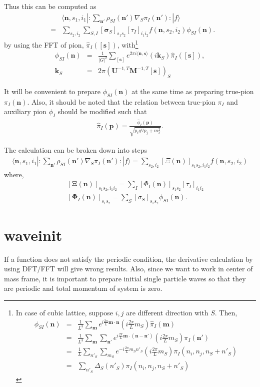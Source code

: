 \documentclass[10pt]{book}
\def\bm{\boldsymbol}
\newcommand{\bea}{\begin{eqnarray}}
\newcommand{\eea}{\end{eqnarray}}
\newcommand{\no}{\nonumber \\}
\def\vs{{\bm \sigma}}
\def\vm{{\bm m}}
\def\vn{{\bm n}}
\def\vp{{\bm p}}
\def\la{\langle}
\def\ra{\rangle}
\begin{document}
\begin{itemize}
	      Thus  this can be computed as
	      \bea 
	      & &\la \vn, s_1, i_1 | : \sum_{\vn'}  \rho_{SI}(\vn')\nabla_S\pi_I(\vn'): |f\ra \no 
	      &=& \sum_{s_2,i_2}\sum_{S,I}  [\vs_S]_{s_1 s_2}[\tau_I]_{i_1 i_2} f(\vn, s_2,i_2) \phi_{SI}(\vn).      
	      \eea
	      by using the FFT of pion,  $\hat{\pi}_I([{\bm s}])$, with\footnote{
	      In case of cubic lattice, 
	      suppose $i,j$ are different direction with $S$. Then,
	      \bea 
	      \phi_{SI}(\vn)&=& \frac{1}{L^3}\sum_{\vm} e^{i \frac{2\pi}{L} \vm\cdot {\bm n} }
	                        (i \frac{2\pi}{L} m_S ) \hat{\pi}_I(\vm) \no 
	                    &=&\frac{1}{L^3}\sum_{\vm}\sum_{\vn'} e^{i \frac{2\pi}{L} \vm\cdot ({\bm n}-\vn') }
	                                 (i \frac{2\pi}{L} m_S ) \pi_I(\vn') \no 
	                    &=&\frac{1}{L}\sum_{n'_S}\sum_{m_S} e^{-i \frac{2\pi}{L} m_S n'_S} 
	                     (i \frac{2\pi}{L} m_S )\pi_I(n_i,n_j,n_S+n'_S)   \no 
	                    &=&  \sum_{n'_S} \Delta_S(n'_S)\pi_I(n_i,n_j,n_S+n'_S)               
	      \eea 
	    
      
          }  
	      \bea 
	        \phi_{SI}(\vn)&=&\frac{1}{|G|^2}\sum_{[{\bm s}]}e^{2\pi i\la \vn,{\bm s}\ra } 
	                      ( i {\bm k}_S )\hat{\pi}_I([{\bm s}]),\no 
	        {\bm k}_S &=& 2\pi \left({\bm U}^{-1,T}{\bm M}^{-1,T}[{\bm s}]\right)_S
	      \eea 
	      
	      It will be convenient to prepare $\phi_{SI}(\vn)$ at the same time as
	      preparing true-pion $\pi_I(\vn)$. 
	      Also, it should be noted that the relation between true-pion $\pi_I$ and 
auxiliary pion $\phi_I$ should be modified such that 
\bea 
\hat{\pi}_I(\vp)=\frac{\hat{\phi}_I(\vp)}{\sqrt{p_i g^{ij} p_j +m_\pi^2} } . 
\eea 
	      
	      The calculation can be broken down into steps
	      \bea 
	       \la \vn, s_1, i_1 | : \sum_{\vn'}  \rho_{SI}(\vn')\nabla_S\pi_I(\vn'): |f\ra
	      = \sum_{s_2,i_2} \left[\Xi  (\vn)\right]_{s_1 s_2,i_1 i_2} f(\vn, s_2,i_2)
	      \eea 
	      where, 
	      \bea 
          & &[{\bm \Xi}(\vn)]_{s_1 s_2,i_1 i_2}=
             \sum_{I} \left[\Phi_{I}(\vn)\right]_{s_1 s_2}
                             \left[\tau_I\right]_{i_1 i_2}  \no 
          & &[{\bm \Phi}_{I}(\vn)]_{s_1 s_2}
              =\sum_{S} \left[\sigma_S\right]_{s_1 s_2}\phi_{SI}(\vn).    
	      \eea 

	      
\end{itemize}

\section{waveinit} 
If a function does not satisfy the periodic condition,
the derivative calculation by using DFT/FFT will give wrong results. 
Also, since we want to work in center of mass frame, 
it is important to prepare initial single particle waves 
so that they are periodic and total momentum of system is zero.
\end{document}
